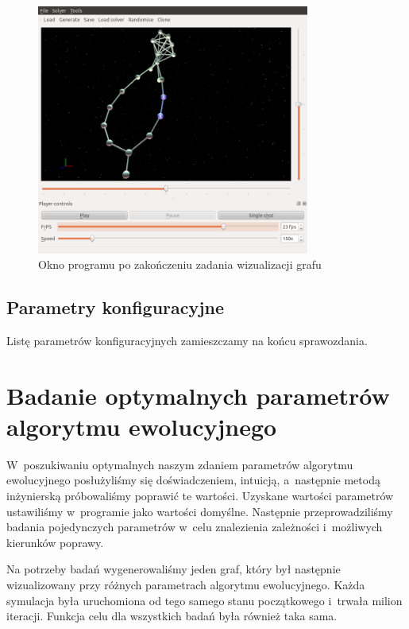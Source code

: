 \documentclass[a4paper,onecolumn,oneside,12pt]{mwart}
\begin{document}
\begin{figure}[tpb]
	\begin{center}
		\includegraphics[width=0.8\textwidth]{screenshots/solved.png}
	\end{center}
	\caption{Okno programu po zakończeniu zadania wizualizacji grafu}
	\label{fig:scr:solved}
\end{figure}

\subsection{Parametry konfiguracyjne}

Listę parametrów konfiguracyjnych zamieszczamy na końcu sprawozdania.

\section{Badanie optymalnych parametrów algorytmu ewolucyjnego}

W~poszukiwaniu optymalnych naszym zdaniem parametrów algorytmu ewolucyjnego
posłużyliśmy się doświadczeniem, intuicją, a~następnie metodą inżynierską
próbowaliśmy poprawić te wartości. Uzyskane wartości parametrów ustawiliśmy
w~programie jako wartości domyślne. Następnie przeprowadziliśmy badania
pojedynczych parametrów w~celu znalezienia zależności i~możliwych kierunków
poprawy.

Na potrzeby badań wygenerowaliśmy jeden graf, który był następnie
wizualizowany przy różnych parametrach algorytmu ewolucyjnego.
Każda symulacja była uruchomiona od tego samego stanu początkowego i~trwała
milion iteracji. Funkcja celu dla wszystkich badań była również taka sama.
\end{document}
